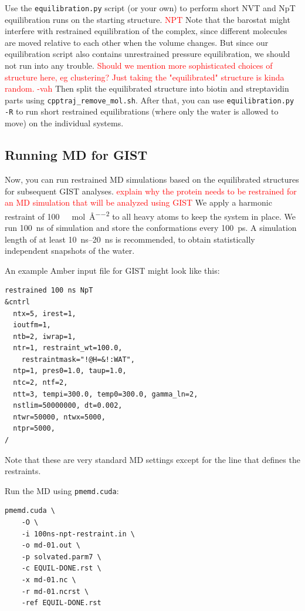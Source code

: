 \documentclass[9pt,tutorial]{livecoms}
\newcommand{\software}{\texttt}
\newcommand{\todo}{\textcolor{red}}
\begin{document}
Use the \software{equilibration.py} script (or your own) to perform short NVT and NpT equilibration runs on the starting structure.
\todo {NPT}
Note that the barostat might interfere with restrained equilibration of the complex, since different molecules are moved relative to each other when the volume changes.
But since our equilibration script also contains unrestrained pressure equilibration, we should not run into any trouble.
\todo{Should we mention more sophisticated choices of structure here, eg clustering? Just taking the "equilibrated" structure is kinda random. -vah}
Then split the equilibrated structure into biotin and streptavidin parts using \software{cpptraj\_remove\_mol.sh}.
After that, you can use \software{equilibration.py -R} to run short restrained equilibrations (where only the water is allowed to move) on the individual systems.

\subsection{Running MD for GIST}

Now, you can run restrained MD simulations based on the equilibrated structures for subsequent GIST analyses.
\todo {explain why the protein needs to be restrained for an MD simulation that will be analyzed using GIST}
We apply a harmonic restraint of \SI{100}{\kilo\calorie\per\mole\per\angstrom\squared} to all heavy atoms to keep the system in place.
We run \SI{100}{\nano\second} of simulation and store the conformations every \SI{100}{\pico\second}.
A simulation length of at least \SIrange{10}{20}{\nano\second} is recommended, to obtain statistically independent snapshots of the water.

An example Amber input file for GIST might look like this:
\begin{lstlisting}
restrained 100 ns NpT
&cntrl
  ntx=5, irest=1,
  ioutfm=1,
  ntb=2, iwrap=1,
  ntr=1, restraint_wt=100.0,
    restraintmask="!@H=&!:WAT",
  ntp=1, pres0=1.0, taup=1.0,
  ntc=2, ntf=2,
  ntt=3, tempi=300.0, temp0=300.0, gamma_ln=2,
  nstlim=50000000, dt=0.002,
  ntwr=50000, ntwx=5000,
  ntpr=5000,
/
\end{lstlisting}
Note that these are very standard MD settings except for the line that defines the restraints.

Run the MD using \software{pmemd.cuda}:
\begin{lstlisting}
pmemd.cuda \
	-O \
	-i 100ns-npt-restraint.in \
	-o md-01.out \
	-p solvated.parm7 \
	-c EQUIL-DONE.rst \
	-x md-01.nc \
	-r md-01.ncrst \
	-ref EQUIL-DONE.rst
\end{lstlisting}
\end{document}
